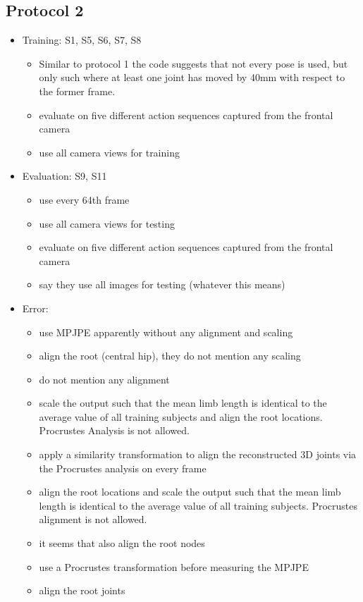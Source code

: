 \subsection{Protocol 2}
	\begin{itemize}
		\item Training: S1, S5, S6, S7, S8
		\begin{itemize}
			\item Similar to protocol 1 the code suggests that not every pose is used, but only such where at least one joint has moved by 40mm with respect to the former frame.
			\item \cite{bogo16} evaluate on five different action sequences captured from the frontal camera
			\item \cite{tekin16, tekin17} use all camera views for training
		\end{itemize}
		\item Evaluation: S9, S11 
		\begin{itemize}
			\item \cite{sun17} use every 64th frame
			\item \cite{tekin16, tekin17} use all camera views for testing
			\item \cite{bogo16} evaluate on five different action sequences captured from the frontal camera
			\item \cite{moreno-noguer16} say they use all images for testing (whatever this means) 
		\end{itemize}
		\item Error: \begin{itemize}
			\item \cite{sun17} use MPJPE apparently without any alignment and scaling
			\item \cite{martinez17} align the root (central hip), they do not mention any scaling
			\item \cite{tome17} do not mention any alignment
			\item \cite{zhou18} scale the output such that the mean limb length is identical to the average value of all training subjects and align the root locations. Procrustes Analysis is not allowed.
			\item \cite{bogo16} apply a similarity transformation to align the reconstructed 3D joints via the Procrustes analysis on every frame
			\item \cite{zhou16} align the root locations and scale the output such that the mean limb length is identical to the average value of all training subjects. Procrustes alignment is not allowed.
			\item it seems that \cite{tekin16} also align the root nodes
			\item \cite{tekin17} use a Procrustes transformation before measuring the MPJPE
			\item \cite{pavlakos17} align the root joints
		\end{itemize}
	\end{itemize}

